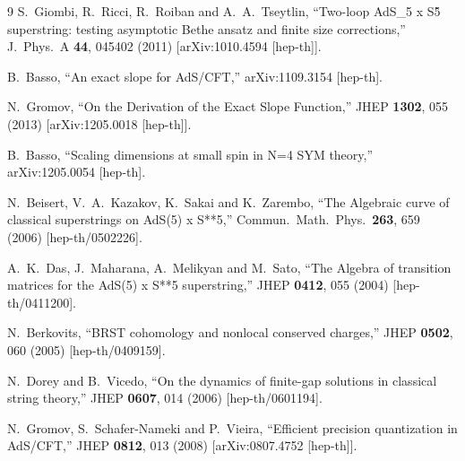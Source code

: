\documentclass[a4paper,11pt]{article}
\numberwithin{equation}{section}
\begin{document}
\begin{thebibliography} {9}
  S.~Giombi, R.~Ricci, R.~Roiban and A.~A.~Tseytlin,
  ``Two-loop AdS\_5 x S\^5 superstring: testing asymptotic Bethe ansatz and finite size corrections,''
  J.\ Phys.\ A {\bf 44}, 045402 (2011)
  [arXiv:1010.4594 [hep-th]].

  B.~Basso,
  ``An exact slope for AdS/CFT,''
  arXiv:1109.3154 [hep-th].

  N.~Gromov,
  ``On the Derivation of the Exact Slope Function,''
  JHEP {\bf 1302}, 055 (2013)
  [arXiv:1205.0018 [hep-th]].

  B.~Basso,
  ``Scaling dimensions at small spin in N=4 SYM theory,''
  arXiv:1205.0054 [hep-th].

  N.~Beisert, V.~A.~Kazakov, K.~Sakai and K.~Zarembo,
  ``The Algebraic curve of classical superstrings on AdS(5) x S**5,''
  Commun.\ Math.\ Phys.\  {\bf 263}, 659 (2006)
  [hep-th/0502226].

  A.~K.~Das, J.~Maharana, A.~Melikyan and M.~Sato,
  ``The Algebra of transition matrices for the AdS(5) x S**5 superstring,''
  JHEP {\bf 0412}, 055 (2004)
  [hep-th/0411200].

  N.~Berkovits,
  ``BRST cohomology and nonlocal conserved charges,''
  JHEP {\bf 0502}, 060 (2005)
  [hep-th/0409159].

  N.~Dorey and B.~Vicedo,
  ``On the dynamics of finite-gap solutions in classical string theory,''
  JHEP {\bf 0607}, 014 (2006)
  [hep-th/0601194].

  N.~Gromov, S.~Schafer-Nameki and P.~Vieira,
  ``Efficient precision quantization in AdS/CFT,''
  JHEP {\bf 0812}, 013 (2008)
  [arXiv:0807.4752 [hep-th]].


\end{thebibliography}
\end{document}
